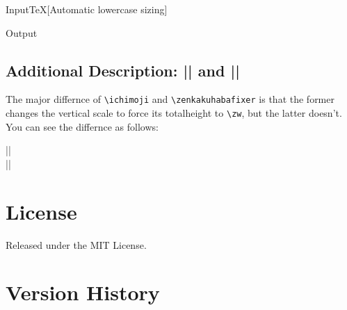 \documentclass[luatex,fontsize=8pt,paper=b5,twoside]{jlreq}%
\begin{document}
\begin{SourceCode}{Input}{TeX}[Automatic lowercase sizing]

\end{SourceCode}

\begin{OutPut}{Output}

\end{OutPut}

\subsection{Additional Description: \KKverb|\ichimoji| and \KKverb|\zenkakuhabafixer|}
The major differnce of \verb|\ichimoji| and \verb|\zenkakuhabafixer| is that the former changes the vertical scale to force its totalheight to \verb|\zw|, but the latter doesn't. You can see the differnce as follows: 

\begin{description}
  \item[\KKverb|\ichimoji|] 
  \item[\KKverb|\zenkakuhabafixer|] 
\end{description}

\section{License}

Released under the MIT License.

\section{Version History}
\end{document}
